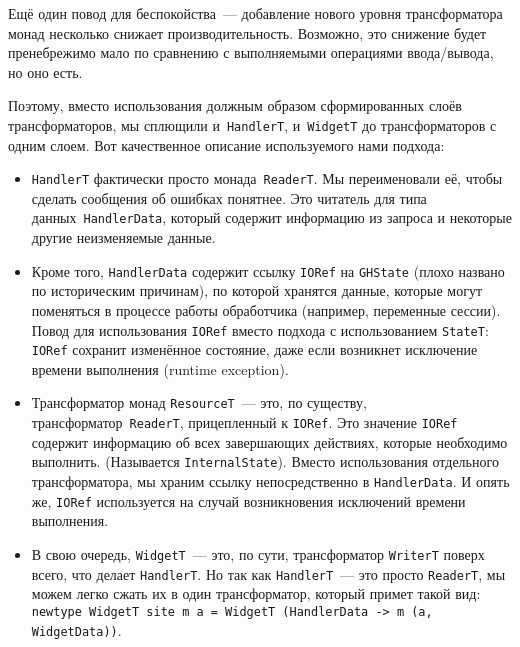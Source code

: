 Ещё один повод для беспокойства~--- добавление нового уровня трансформатора монад
несколько снижает производительность. Возможно, это снижение будет пренебрежимо
мало по сравнению с выполняемыми операциями ввода/вывода, но оно есть.

Поэтому, вместо использования должным образом сформированных слоёв
трансформаторов, мы сплющили и~\lstinline'HandlerT', и~\lstinline'WidgetT' до
трансформаторов с одним слоем.  Вот качественное описание используемого нами
подхода:
\begin{itemize}
    \item \lstinline'HandlerT' фактически просто монада~\lstinline'ReaderT'. Мы
        переименовали её, чтобы сделать сообщения об ошибках понятнее. Это
        читатель для типа данных~\lstinline'HandlerData', который содержит
        информацию из запроса и некоторые другие неизменяемые данные.

    \item Кроме того, \lstinline'HandlerData' содержит ссылку \lstinline'IORef'
        на \lstinline'GHState' (плохо названо по историческим причинам), по
        которой хранятся данные, которые могут поменяться в процессе работы
        обработчика (например, переменные сессии). Повод для использования
        \lstinline'IORef' вместо подхода с использованием \lstinline'StateT':
        \lstinline'IORef' сохранит изменённое состояние, даже если возникнет
        исключение времени выполнения (runtime exception).

    \item Трансформатор монад \lstinline'ResourceT'~--- это, по существу,
        трансформатор~\lstinline'ReaderT', прицепленный к \lstinline'IORef'. Это
        значение \lstinline'IORef' содержит информацию об всех завершающих
        действиях, которые необходимо выполнить. (Называется
        \lstinline'InternalState'). Вместо использования отдельного
        трансформатора, мы храним ссылку непосредственно в
        \lstinline'HandlerData'. И опять же, \lstinline'IORef' используется на
        случай возникновения исключений времени выполнения.

    \item В свою очередь, \lstinline'WidgetT'~--- это, по сути, трансформатор
        \lstinline'WriterT' поверх всего, что делает \lstinline'HandlerT'. Но
        так как \lstinline'HandlerT'~--- это просто \lstinline'ReaderT', мы
        можем легко сжать их в один трансформатор, который примет такой вид:
        \lstinline'newtype WidgetT site m a = WidgetT (HandlerData -> m (a, WidgetData))'.
\end{itemize}

